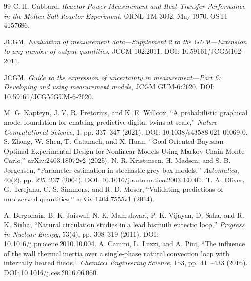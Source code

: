 \begin{thebibliography}{99}
C. H. Gabbard, \emph{Reactor Power Measurement and Heat Transfer Performance in the Molten Salt Reactor Experiment}, ORNL-TM-3002, May 1970. OSTI 4157686.

JCGM, \emph{Evaluation of measurement data---Supplement 2 to the GUM---Extension to any number of output quantities}, JCGM 102:2011. DOI: 10.59161/JCGM102-2011.

JCGM, \emph{Guide to the expression of uncertainty in measurement---Part 6: Developing and using measurement models}, JCGM GUM-6:2020. DOI: 10.59161/JCGMGUM-6-2020.


M. G. Kapteyn, J. V. R. Pretorius, and K. E. Willcox, ``A probabilistic graphical model foundation for enabling predictive digital twins at scale,'' \emph{Nature Computational Science}, 1, pp. 337--347 (2021). DOI: 10.1038/s43588-021-00069-0.
S. Zhong, W. Shen, T. Catanach, and X. Huan, ``Goal-Oriented Bayesian Optimal Experimental Design for Nonlinear Models Using Markov Chain Monte Carlo,'' arXiv:2403.18072v2 (2025).
N. R. Kristensen, H. Madsen, and S. B. J{\o}rgensen, ``Parameter estimation in stochastic grey-box models,'' \emph{Automatica}, 40(2), pp. 225--237 (2004). DOI: 10.1016/j.automatica.2003.10.001.
T. A. Oliver, G. Terejanu, C. S. Simmons, and R. D. Moser, ``Validating predictions of unobserved quantities,'' arXiv:1404.7555v1 (2014).


A. Borgohain, B. K. Jaiswal, N. K. Maheshwari, P. K. Vijayan, D. Saha, and R. K. Sinha, ``Natural circulation studies in a lead bismuth eutectic loop,'' \emph{Progress in Nuclear Energy}, 53(4), pp. 308--319 (2011). DOI: 10.1016/j.pnucene.2010.10.004.
A. Cammi, L. Luzzi, and A. Pini, ``The influence of the wall thermal inertia over a single-phase natural convection loop with internally heated fluids,'' \emph{Chemical Engineering Science}, 153, pp. 411--433 (2016). DOI: 10.1016/j.ces.2016.06.060.
\end{thebibliography}
